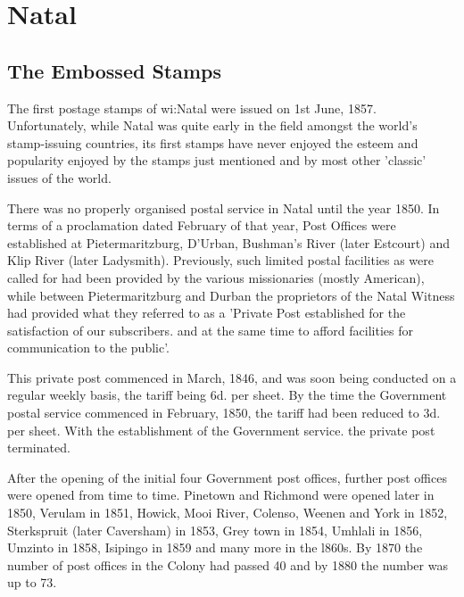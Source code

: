 \chapter{Natal}


\section{The Embossed Stamps}

The  first  postage  stamps  of  {{wi:Natal}}  were  issued  on  1st  June,  1857.    Unfortunately, while Natal was  quite  early in the field  amongst  the 
world's  stamp-issuing  countries,  its  first  stamps  have  never  enjoyed  the 
esteem  and  popularity  enjoyed  by  the  stamps  just  mentioned  and  by  most 
other 'classic' issues of the world.  

There  was  no  properly  organised  postal  service  in  Natal  until  the  year 
1850.  In terms  of a  proclamation  dated  February  of that  year,  Post  Offices 
were  established  at  Pietermaritzburg,  D'Urban,  Bushman's  River  (later 
Estcourt)  and  Klip  River  (later  Ladysmith).  Previously,  such  limited  postal 
facilities  as  were  called  for  had  been  provided  by  the  various  missionaries 
(mostly  American),  while  between  Pietermaritzburg  and  Durban  the  proprietors  of  the  Natal  Witness  had  provided  what  they  referred  to  as  a 
'Private Post  established  for  the  satisfaction  of  our subscribers.  and  at  the 
same time to afford facilities for communication to the public'.  

This private 
post  commenced  in  March,  1846,  and  was  soon  being  conducted  on  a 
regular weekly  basis,  the tariff  being  6d.  per sheet.  By the time  the  Government  postal  service  commenced  in  February,  1850,  the  tariff  had  been 
reduced to  3d.  per sheet. With  the  establishment  of  the Government service. 
the  private  post  terminated. 

After the opening of the initial four  Government post  offices,  further post 
offices were opened from time to time.  Pinetown and Richmond were opened 
later in  1850,  Verulam  in  1851,  Howick,  Mooi  River,  Colenso, Weenen  and 
York  in  1852,  Sterkspruit  (later  Caversham)  in  1853,  Grey town  in  1854, 
Umhlali in  1856,  Umzinto  in  1858,  Isipingo  in  1859  and  many  more  in  the 
l860s.  By  1870  the  number  of  post  offices  in  the  Colony  had  passed  40 
and by 1880 the number was up to 73.


